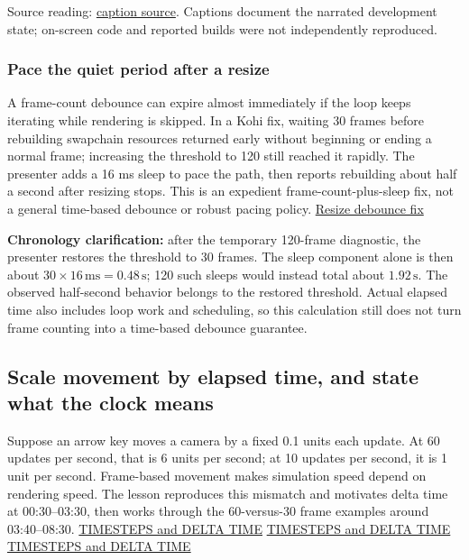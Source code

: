 Source reading: \href{https://www.youtube.com/watch?v=bbPdEkRaVNE}{caption source}. Captions document the narrated development state; on-screen code and reported builds were not independently reproduced.

\subsubsection{Pace the quiet period after a resize}\label{05-engine-i-ch014-pace-the-quiet-period-after-a-resize}

A frame-count debounce can expire almost immediately if the loop keeps iterating while rendering is skipped. In a Kohi fix, waiting 30 frames before rebuilding swapchain resources returned early without beginning or ending a normal frame; increasing the threshold to 120 still reached it rapidly. The presenter adds a 16 ms sleep to pace the path, then reports rebuilding about half a second after resizing stops. This is an expedient frame-count-plus-sleep fix, not a general time-based debounce or robust pacing policy. \href{https://www.youtube.com/watch?v=x8ao57nbMlY}{Resize debounce fix}

\textbf{Chronology clarification:} after the temporary 120-frame diagnostic, the presenter restores the threshold to 30 frames. The sleep component alone is then about \(30\times16\,\mathrm{ms}=0.48\,\mathrm{s}\); 120 such sleeps would instead total about \(1.92\,\mathrm{s}\). The observed half-second behavior belongs to the restored threshold. Actual elapsed time also includes loop work and scheduling, so this calculation still does not turn frame counting into a time-based debounce guarantee.

\subsection{Scale movement by elapsed time, and state what the clock means}\label{05-engine-i-ch014-scale-movement-by-elapsed-time-and-state-what-the-clock-means}

Suppose an arrow key moves a camera by a fixed 0.1 units each update. At 60 updates per second, that is 6 units per second; at 10 updates per second, it is 1 unit per second. Frame-based movement makes simulation speed depend on rendering speed. The lesson reproduces this mismatch and motivates delta time at 00:30--03:30, then works through the 60-versus-30 frame examples around 03:40--08:30. \href{https://www.youtube.com/watch?v=pctGOMDW-HQ&t=30s}{TIMESTEPS and DELTA TIME} \href{https://www.youtube.com/watch?v=pctGOMDW-HQ&t=220s}{TIMESTEPS and DELTA TIME} \href{https://www.youtube.com/watch?v=pctGOMDW-HQ&t=500s}{TIMESTEPS and DELTA TIME}

